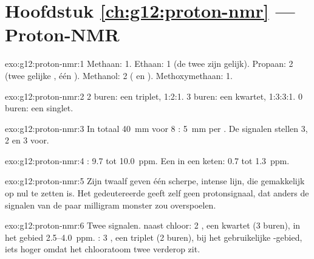 \section*{Hoofdstuk \ref{ch:g12:proton-nmr} --- Proton-NMR}

\begin{solution}{exo:g12:proton-nmr:1}
Methaan: 1. Ethaan: 1 (de twee  zijn gelijk). Propaan: 2 (twee
gelijke , één ). Methanol: 2 ( en ).
Methoxymethaan: 1.
\end{solution}

\begin{solution}{exo:g12:proton-nmr:2}
2 buren: een triplet, 1:2:1. 3 buren: een kwartet, 1:3:3:1.
0 buren: een singlet.
\end{solution}

\begin{solution}{exo:g12:proton-nmr:3}
In totaal \qty{40}{mm} voor 8 : \qty{5}{mm} per . De
signalen stellen 3, 2 en 3  voor.
\end{solution}

\begin{solution}{exo:g12:proton-nmr:4}
: 9.7 tot \qty{10.0}{ppm}. Een  in een keten: 0.7 tot
\qty{1.3}{ppm}.
\end{solution}

\begin{solution}{exo:g12:proton-nmr:5}
Zijn twaalf  geven één scherpe, intense lijn, die
gemakkelijk op nul te zetten is. Het gedeutereerde  geeft zelf
geen protonsignaal, dat anders de signalen van de paar milligram monster
zou overspoelen.
\end{solution}

\begin{solution}{exo:g12:proton-nmr:6}
Twee signalen.  naast chloor: 2 , een kwartet (3
buren), in het gebied 2.5--\qty{4.0}{ppm}. : 3 , een
triplet (2 buren), bij het gebruikelijke -gebied, iets hoger
omdat het chlooratoom twee  verderop zit.
\end{solution}

